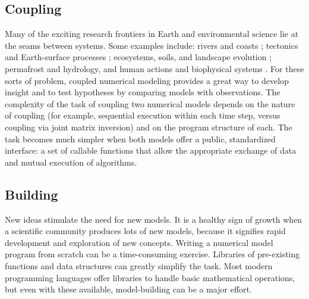 \documentclass[journal abbreviation, manuscript]{copernicus}
\begin{document}
\subsection{Coupling}

Many of the exciting research frontiers in Earth and environmental science lie at the seams between systems. Some examples include: rivers and coasts \citep[e.g.,][]{ratliff2018exploring}; tectonics and Earth-surface processes \citep[e.g.,][]{roy2016dynamic}; ecosystems, soils, and landscape evolution \citep[e.g.,][]{istanbulluoglu2005vegetation,pelletier2017way,lyons2020speciesevolver}; permafrost and hydrology, and human actions and biophysical systems \citep[e.g.,][]{robinson2018modelling}. For these sorts of problem, coupled numerical modeling provides a great way to develop insight and to test hypotheses by comparing models with observations. The complexity of the task of coupling two numerical models depends on the nature of coupling (for example, sequential execution within each time step, versus coupling via joint matrix inversion) and on the program structure of each. The task becomes much simpler when both models offer a public, standardized interface: a set of callable functions that allow the appropriate exchange of data and mutual execution of algorithms.

\subsection{Building}\label{sec:build}

New ideas stimulate the need for new models. It is a healthy sign of growth when a scientific community produces lots of new models, because it signifies rapid development and exploration of new concepts. Writing a numerical model program from scratch can be a time-consuming exercise. Libraries of pre-existing functions and data structures can greatly simplify the task. Most modern programming languages offer libraries to handle basic mathematical operations, but even with these available, model-building can be a major effort. 
\end{document}
